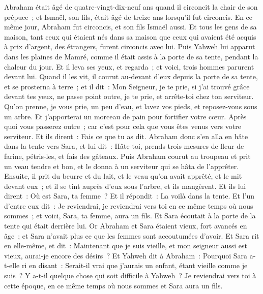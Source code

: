 \begin{multicols}{2}
Abraham était âgé de quatre-vingt-dix-neuf ans quand il circoncit la chair de son prépuce~;
et Ismaël, son fils, était âgé de treize ans lorsqu'il fut circoncis.
En ce même jour, Abraham fut circoncis, et son fils Ismaël aussi.
Et tous les gens de sa maison, tant ceux qui étaient nés dans sa maison que ceux qui avaient été acquis à prix d'argent, des étrangers, furent circoncis avec lui.
\VerseOne{}Puis Yahweh lui apparut dans les plaines de Mamré, comme il était assis à la porte de sa tente, pendant la chaleur du jour.
Et il leva ses yeux, et regarda~; et voici, trois hommes parurent devant lui. Quand il les vit, il courut au-devant d'eux depuis la porte de sa tente, et se prosterna à terre~;
et il dit~: Mon Seigneur, je te prie, si j'ai trouvé grâce devant tes yeux, ne passe point outre, je te prie, et arrête-toi chez ton serviteur.
Qu'on prenne, je vous prie, un peu d'eau, et lavez vos pieds, et reposez-vous sous un arbre.
Et j'apporterai un morceau de pain pour fortifier votre cœur. Après quoi vous passerez outre~; car c'est pour cela que vous êtes venus vers votre serviteur. Et ils dirent~: Fais ce que tu as dit.
Abraham donc s'en alla en hâte dans la tente vers Sara, et lui dit~: Hâte-toi, prends trois mesures de fleur de farine, pétris-les, et fais des gâteaux.
Puis Abraham courut au troupeau et prit un veau tendre et bon, et le donna à un serviteur qui se hâta de l'apprêter.
Ensuite, il prit du beurre et du lait, et le veau qu'on avait apprêté, et le mit devant eux~; et il se tint auprès d'eux sous l'arbre, et ils mangèrent.
Et ils lui dirent~: Où est Sara, ta femme~? Et il répondit~: La voilà dans la tente.
Et l'un d'entre eux dit~: Je reviendrai, je reviendrai vers toi en ce même temps où nous sommes~; et voici, Sara, ta femme, aura un fils. Et Sara écoutait à la porte de la tente qui était derrière lui.
Or Abraham et Sara étaient vieux, fort avancés en âge~; et Sara n'avait plus ce que les femmes sont accoutumées d'avoir.
Et Sara rit en elle-même, et dit~: Maintenant que je suis vieille, et mon seigneur aussi est vieux, aurai-je encore des désirs~?
Et Yahweh dit à Abraham~: Pourquoi Sara a-t-elle ri en disant~: Serait-il vrai que j'aurais un enfant, étant vieille comme je suis~?
Y a-t-il quelque chose qui soit difficile à Yahweh~? Je reviendrai vers toi à cette époque, en ce même temps où nous sommes et Sara aura un fils.

\end{multicols}
